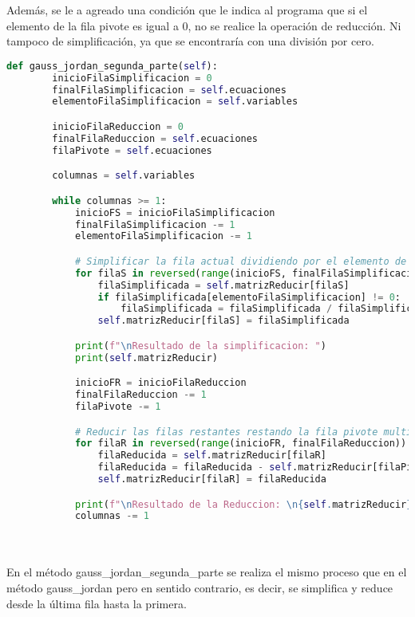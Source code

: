 \documentclass[letterpaper,12pt]{article}
\begin{document}
Además, se le a agreado una condición que le indica al programa que si el elemento de la fila pivote es igual a 0, no se realice la operación de reducción.
Ni tampoco de simplificación, ya que se encontraría con una división por cero.
\\\begin{lstlisting}[style=jupyter, language=Python, caption={Método para resolver el sistema de ecuaciones}]
    def gauss_jordan_segunda_parte(self):
        inicioFilaSimplificacion = 0
        finalFilaSimplificacion = self.ecuaciones
        elementoFilaSimplificacion = self.variables

        inicioFilaReduccion = 0
        finalFilaReduccion = self.ecuaciones
        filaPivote = self.ecuaciones

        columnas = self.variables

        while columnas >= 1:
            inicioFS = inicioFilaSimplificacion
            finalFilaSimplificacion -= 1
            elementoFilaSimplificacion -= 1

            # Simplificar la fila actual dividiendo por el elemento de la columna correspondiente
            for filaS in reversed(range(inicioFS, finalFilaSimplificacion + 1)):
                filaSimplificada = self.matrizReducir[filaS]
                if filaSimplificada[elementoFilaSimplificacion] != 0:
                    filaSimplificada = filaSimplificada / filaSimplificada[elementoFilaSimplificacion]
                self.matrizReducir[filaS] = filaSimplificada

            print(f"\nResultado de la simplificacion: ")
            print(self.matrizReducir)

            inicioFR = inicioFilaReduccion
            finalFilaReduccion -= 1
            filaPivote -= 1

            # Reducir las filas restantes restando la fila pivote multiplicada por el elemento correspondiente
            for filaR in reversed(range(inicioFR, finalFilaReduccion)):
                filaReducida = self.matrizReducir[filaR]
                filaReducida = filaReducida - self.matrizReducir[filaPivote]
                self.matrizReducir[filaR] = filaReducida

            print(f"\nResultado de la Reduccion: \n{self.matrizReducir}")
            columnas -= 1
\end{lstlisting}
\\\\
En el método \textcolor{jl_keyword}{gauss\_jordan\_segunda\_parte} se realiza el mismo proceso que en el método \textcolor{jl_keyword}{gauss\_jordan} pero en sentido contrario, es decir, se simplifica y reduce desde la última fila hasta la primera.
\end{document}
